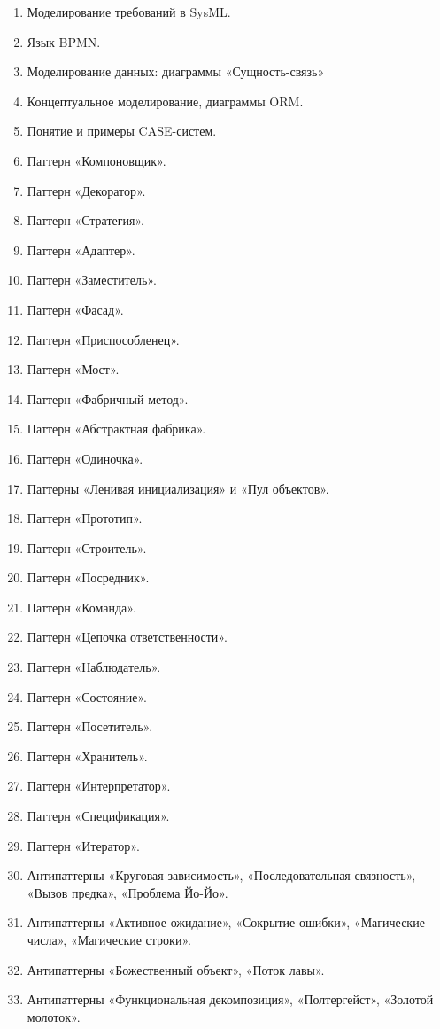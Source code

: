 \documentclass[a5paper]{article}
\begin{document}
\begin{enumerate}
    \item Моделирование требований в SysML.
    \item Язык BPMN.
    \item Моделирование данных: диаграммы «Сущность-связь»
    \item Концептуальное моделирование, диаграммы ORM.
    \item Понятие и примеры CASE-систем.
    \item Паттерн «Компоновщик».
    \item Паттерн «Декоратор».
    \item Паттерн «Стратегия».
    \item Паттерн «Адаптер».
    \item Паттерн «Заместитель».
    \item Паттерн «Фасад».
    \item Паттерн «Приспособленец».
    \item Паттерн «Мост».
    \item Паттерн «Фабричный метод».
    \item Паттерн «Абстрактная фабрика».
    \item Паттерн «Одиночка».
    \item Паттерны «Ленивая инициализация» и «Пул объектов».
    \item Паттерн «Прототип».
    \item Паттерн «Строитель».
    \item Паттерн «Посредник».
    \item Паттерн «Команда».
    \item Паттерн «Цепочка ответственности».
    \item Паттерн «Наблюдатель».
    \item Паттерн «Состояние».
    \item Паттерн «Посетитель».
    \item Паттерн «Хранитель».
    \item Паттерн «Интерпретатор».
    \item Паттерн «Спецификация».
    \item Паттерн «Итератор».
    \item Антипаттерны «Круговая зависимость», «Последовательная связность», «Вызов предка», «Проблема Йо-Йо».
    \item Антипаттерны «Активное ожидание», «Сокрытие ошибки», «Магические числа», «Магические строки».
    \item Антипаттерны «Божественный объект», «Поток лавы».
    \item Антипаттерны «Функциональная декомпозиция», «Полтергейст», «Золотой молоток».

\end{enumerate}
\end{document}
